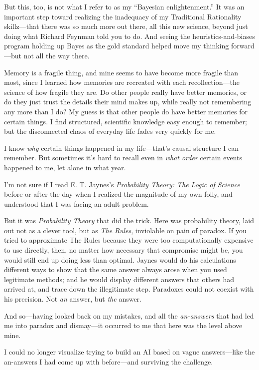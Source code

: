 {
 But this, too, is not what I refer to as my
``Bayesian enlightenment.'' It was
an important step toward realizing the inadequacy of my Traditional
Rationality skillz---that there was so much more out there, all this
new science, beyond just doing what Richard Feynman told you to do. And
seeing the heuristics-and-biases program holding up Bayes as the gold
standard helped move my thinking forward---but not all the way there.}

{
 Memory is a fragile thing, and mine seems to have become more
fragile than most, since I learned how memories are recreated with each
recollection---the science of how fragile they are. Do other people
really have better memories, or do they just trust the details their
mind makes up, while really not remembering any more than I do? My
guess is that other people do have better memories for certain things.
I find structured, scientific knowledge easy enough to remember; but
the disconnected chaos of everyday life fades very quickly for me.}

{
 I know \textit{why} certain things happened in my
life---that's causal structure I can remember. But
sometimes it's hard to recall even in \textit{what
order} certain events happened to me, let alone in what year.}

{
 I'm not sure if I read E. T.
Jaynes's \textit{Probability Theory: The Logic of
Science} before or after the day when I realized the magnitude of my
own folly, and understood that I was facing an adult problem.}

{
 But it was \textit{Probability Theory} that did the trick. Here
was probability theory, laid out not as a clever tool, but as
\textit{The Rules}, inviolable on pain of paradox. If you tried to
approximate The Rules because they were too computationally expensive
to use directly, then, no matter how necessary that compromise might
be, you would still end up doing less than optimal. Jaynes would do his
calculations different ways to show that the same answer always arose
when you used legitimate methods; and he would display different
answers that others had arrived at, and trace down the illegitimate
step. Paradoxes could not coexist with his precision. Not \textit{an}
answer, but \textit{the} answer.}

{
 And so---having looked back on my mistakes, and all the
\textit{an-answers} that had led me into paradox and dismay---it
occurred to me that here was the level above mine.}

{
 I could no longer visualize trying to build an AI based on vague
answers---like the an-answers I had come up with before---and surviving
the challenge.}

